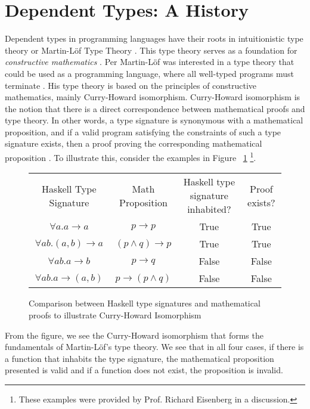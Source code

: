 \section{Dependent Types: A History}
Dependent types in programming languages have their roots in intuitionistic type
theory or Martin-L\"{o}f Type Theory \cite{intro_martin_lof, ml_type_theory}. This
type theory serves as a foundation for \textit{constructive mathematics}
\cite{constructive_math}. Per Martin-L\"{o}f was interested in a type theory that
could be used as a programming language, where all well-typed programs must
terminate \cite{ml_type_theory}. His type theory is based on the principles of
constructive mathematics, mainly Curry-Howard isomorphism. Curry-Howard
isomorphism is the notion that there is a direct correspondence between
mathematical proofs and type theory. In other words, a type signature is
synonymous with a mathematical proposition, and if a valid program satisfying
the constraints of such a type signature exists, then a proof proving the
corresponding mathematical proposition \cite{martin_lof, ml_type_theory}. To
illustrate this, consider the examples in Figure ~\ref{ml_type_theory_examples}
\footnote{These examples were provided by Prof. Richard Eisenberg in a
discussion.}. 

\begin{figure}[h]
    \label{ml_type_theory_examples}
    \caption{Comparison between Haskell type signatures and mathematical proofs to illustrate Curry-Howard Isomorphism}
    \begin{tabular}{c|c|c|c}
        Haskell Type Signature & Math Proposition & Haskell type signature inhabited? & Proof exists? \\
        $\forall a. a \rightarrow a$ & $p \rightarrow p$ & True & True \\
        $\forall ab. (a,b) \rightarrow a$ & $ (p \wedge q) \rightarrow p$ & True & True \\
        $\forall ab. a \rightarrow b$ & $p\rightarrow q$ & False & False \\
        $\forall ab. a \rightarrow (a,b)$ & $p \rightarrow (p\wedge q)$ & False & False 
    \end{tabular}
\end{figure}

From the figure, we see the Curry-Howard isomorphism that forms the fundamentals
of Martin-L\"{o}f's type theory. We see that in all four cases, if there is a
function that inhabits the type signature, the mathematical proposition
presented is valid and if a function does not exist, the proposition is invalid. 

